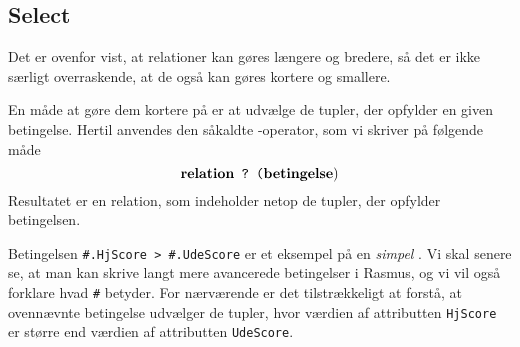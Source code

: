 \subsection{Select}
Det er ovenfor vist, at relationer kan g\o{}res l\ae{}ngere og bredere,
s\aa{} det er ikke s\ae{}rligt overraskende, at de ogs\aa{} kan g\o{}res
kortere og smallere.

En m\aa{}de at g\o{}re dem kortere p\aa{} er at udv\ae{}lge de tupler,
der opfylder en given betingelse. Hertil anvendes den s\aa{}kaldte
{\em {}}-operator, som vi skriver p\aa{} f\o{}lgende m\aa{}de
$$ \mbox{\bf relation} \mbox{\tt ~?~(} \mbox{\bf betingelse} ) $$
Resultatet er en relation, som indeholder netop de tupler, der opfylder
betingelsen.


Betingelsen \verb"#.HjScore > #.UdeScore" er et eksempel p\aa{} en
{\em simpel\/} . Vi skal senere se, at man kan skrive langt
mere avancerede be\-ting\-elser i {\sc Rasmus}, og vi vil ogs\aa{} forklare
hvad \verb"#" betyder. For n\ae{}r\-v\ae{}r\-en\-de er det tilstr\ae{}kkeligt
at forst\aa{}, at ovenn\ae{}vnte betingelse udv\ae{}lger de tup\-ler,
hvor v\ae{}rdien af attributten \verb"HjScore" er st\o{}rre end
v\ae{}rdien af attributten \verb"UdeScore".

